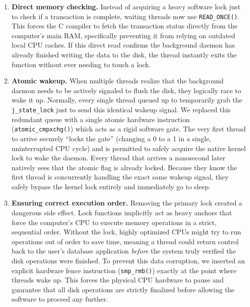 \documentclass[12pt,a4paper]{article}
\begin{document}
\begin{enumerate}[leftmargin=*]
  \item \textbf{Direct memory checking.} Instead of acquiring a
        heavy software lock just to check if a transaction is
        complete, waiting threads now use \texttt{READ\_ONCE()}.
        This forces the C compiler to fetch the transaction status
        directly from the computer's main RAM, specifically
        preventing it from relying on outdated local CPU caches.
        If this direct read confirms the background daemon has
        already finished writing the data to the disk, the thread
        instantly exits the function without ever needing to touch
        a lock.
    \item \textbf{Atomic wakeup.} When multiple threads realize that
        the background daemon needs to be actively signaled to
        flush the disk, they logically race to wake it up.
        Normally, every single thread queued up to temporarily grab the \texttt{j\_state\_lock} just to send this identical wakeup signal. 
        We replaced this redundant queue with a single atomic
        hardware instruction (\texttt{atomic\_cmpxchg()}) which
        acts as a rigid software gate. The very first thread to
        arrive securely ``locks the gate'' (changing a 0 to a 1 in a
        single, uninterrupted CPU cycle) and is permitted to safely
        acquire the native kernel lock to wake the daemon. Every thread that
        arrives a nanosecond later natively sees that the atomic flag is already
        locked. Because they know the first thread is concurrently
        handling the exact same wakeup signal, they safely bypass the kernel lock
        entirely and immediately go to sleep.

  \item \textbf{Ensuring correct execution order.} Removing the
        primary lock created a dangerous side effect. Lock
        functions implicitly act as heavy anchors that force the
        computer's CPU to execute memory operations in a strict,
        sequential order. Without the lock, highly optimized CPUs
        might try to run operations out of order to save time,
        meaning a thread could return control back to the user's
        database application \textit{before} the system truly
        verified the disk operations were finished. To prevent
        this data corruption, we inserted an explicit hardware
        fence instruction (\texttt{smp\_rmb()}) exactly at the
        point where threads wake up. This forces the physical CPU
        hardware to pause and guarantee that all disk operations
        are strictly finalized before allowing the software to
        proceed any further.
\end{enumerate}
\end{document}
